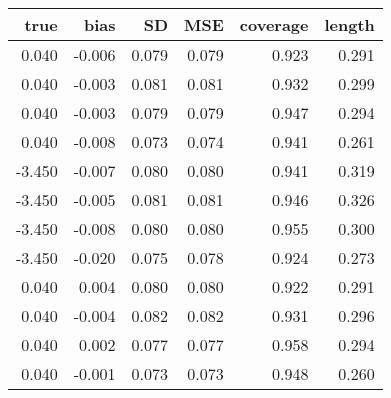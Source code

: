 \begin{table}[ht]
\centering
\begin{tabular}{rrrrrr}
  \hline
true & bias & SD & MSE & coverage & length \\ 
  \hline
0.040 & -0.006 & 0.079 & 0.079 & 0.923 & 0.291 \\ 
  0.040 & -0.003 & 0.081 & 0.081 & 0.932 & 0.299 \\ 
  0.040 & -0.003 & 0.079 & 0.079 & 0.947 & 0.294 \\ 
  0.040 & -0.008 & 0.073 & 0.074 & 0.941 & 0.261 \\ 
  -3.450 & -0.007 & 0.080 & 0.080 & 0.941 & 0.319 \\ 
  -3.450 & -0.005 & 0.081 & 0.081 & 0.946 & 0.326 \\ 
  -3.450 & -0.008 & 0.080 & 0.080 & 0.955 & 0.300 \\ 
  -3.450 & -0.020 & 0.075 & 0.078 & 0.924 & 0.273 \\ 
  0.040 & 0.004 & 0.080 & 0.080 & 0.922 & 0.291 \\ 
  0.040 & -0.004 & 0.082 & 0.082 & 0.931 & 0.296 \\ 
  0.040 & 0.002 & 0.077 & 0.077 & 0.958 & 0.294 \\ 
  0.040 & -0.001 & 0.073 & 0.073 & 0.948 & 0.260 \\ 
   \hline
\end{tabular}
\end{table}
